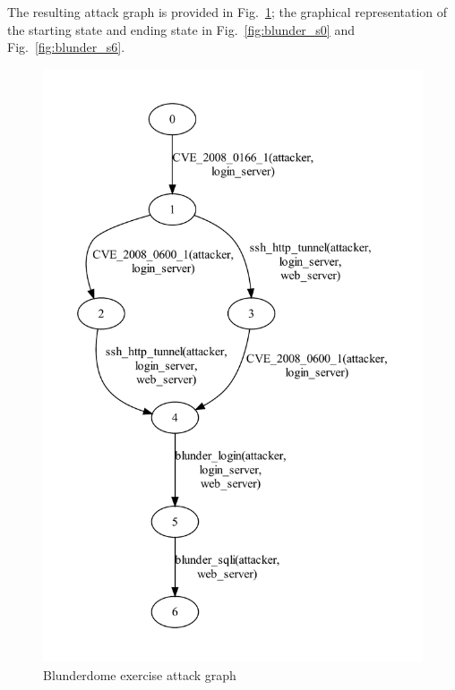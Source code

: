 The resulting attack graph is provided in Fig.~\ref{fig:blunder_ag}; the
graphical representation of the starting state and ending state in 
Fig.~\ref{fig:blunder_s0} and Fig.~\ref{fig:blunder_s6}.

\begin{figure}
\centering
\includegraphics[width=5in]{ag_blunderdome/ag_depth5}
\caption{Blunderdome exercise attack graph}
\label{fig:blunder_ag}
\end{figure}

